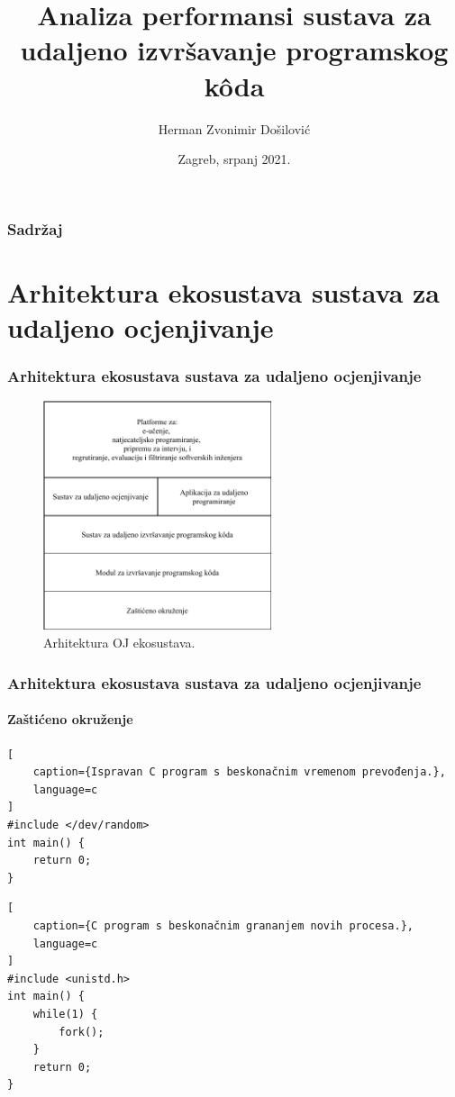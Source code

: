 \documentclass{beamer}
\title[Diplomski rad br.\ 2565]{Analiza performansi sustava za udaljeno izvršavanje programskog kôda}
\author{Herman Zvonimir Došilović}
\institute[FER]{Sveučilište u Zagrebu Fakultet elektrotehnike i računarstva}
\date{Zagreb, srpanj 2021.}
\begin{document}
\frame{\titlepage}

\begin{frame}
\frametitle{Sadržaj}
\tableofcontents
\end{frame}

\section{Arhitektura ekosustava sustava za udaljeno ocjenjivanje}
\begin{frame}
\frametitle{Arhitektura ekosustava sustava za udaljeno ocjenjivanje}
\begin{figure}[htb]
	\centering
	\includegraphics[width=0.6\textwidth]{images/Ekosustav.pdf}
	\caption{Arhitektura OJ ekosustava. \citep{9245310}}
\end{figure}
\end{frame}

\begin{frame}[fragile]
\frametitle{Arhitektura ekosustava sustava za udaljeno ocjenjivanje}
\framesubtitle{Zaštićeno okruženje}
\begin{lstlisting}[
	caption={Ispravan C program s beskonačnim vremenom prevođenja.},
	language=c
]
#include </dev/random>
int main() {
    return 0;
}
\end{lstlisting}
\begin{lstlisting}[
	caption={C program s beskonačnim grananjem novih procesa.},
	language=c
]
#include <unistd.h>
int main() {
    while(1) {
        fork();
    }
    return 0;
}
\end{lstlisting}
\end{frame}
\end{document}
